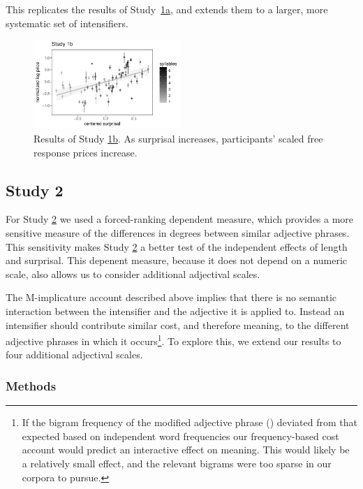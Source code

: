 This replicates the results of Study~\hyperref[sec:study1a]{1a}, and extends them to a larger, more systematic set of intensifiers.

\begin{figure}[ht]
\begin{center}
\includegraphics[width=0.5\textwidth]{images/plot_study1b.pdf}
\end{center}
\caption{Results of Study \hyperref[sec:study1b]{1b}. As surprisal increases, participants' scaled free response prices increase.} 
\label{fig:plot_study1b}
\end{figure}

\subsection{Study 2 \label{sec:study2}}

For Study \hyperref[sec:study2]{2} we used a forced-ranking dependent measure, which provides a more sensitive measure of the differences in degrees between similar adjective phrases.
This sensitivity makes Study \hyperref[sec:study2]{2} a better test of the independent effects of length and surprisal.
This depenent measure, because it does not depend on a numeric scale, also allows us to consider additional adjectival scales.

The M-implicature account described above implies that there is no semantic interaction between the intensifier and the adjective it is applied to.
Instead an intensifier should contribute similar cost, and therefore meaning, to the different adjective phrases in which it occurs\footnote{If the bigram frequency of the modified adjective phrase () deviated from that expected based on independent word frequencies our frequency-based cost account would predict an interactive effect on meaning.
This would likely be a relatively small effect, and the relevant bigrams were too sparse in our corpora to pursue.}.
To explore this, we extend our results to four additional adjectival scales.


\subsubsection{Methods}

